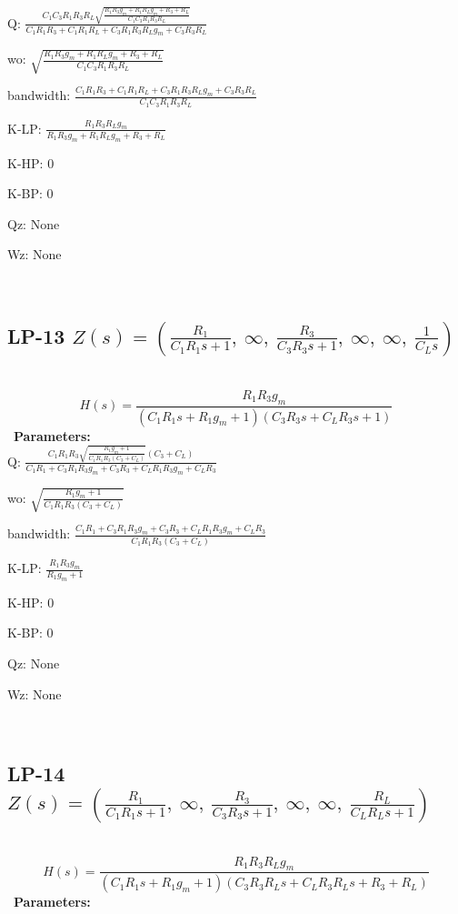 \documentclass{article}
\begin{document}
Q: $\frac{C_{1} C_{3} R_{1} R_{3} R_{L} \sqrt{\frac{R_{1} R_{3} g_{m} + R_{1} R_{L} g_{m} + R_{3} + R_{L}}{C_{1} C_{3} R_{1} R_{3} R_{L}}}}{C_{1} R_{1} R_{3} + C_{1} R_{1} R_{L} + C_{3} R_{1} R_{3} R_{L} g_{m} + C_{3} R_{3} R_{L}}$\ 

wo: $\sqrt{\frac{R_{1} R_{3} g_{m} + R_{1} R_{L} g_{m} + R_{3} + R_{L}}{C_{1} C_{3} R_{1} R_{3} R_{L}}}$\ 

bandwidth: $\frac{C_{1} R_{1} R_{3} + C_{1} R_{1} R_{L} + C_{3} R_{1} R_{3} R_{L} g_{m} + C_{3} R_{3} R_{L}}{C_{1} C_{3} R_{1} R_{3} R_{L}}$\ 

K-LP: $\frac{R_{1} R_{3} R_{L} g_{m}}{R_{1} R_{3} g_{m} + R_{1} R_{L} g_{m} + R_{3} + R_{L}}$\ 

K-HP: $0$\ 

K-BP: $0$\ 

Qz: $\text{None}$\ 

Wz: $\text{None}$\ 

\ 

\subsection{LP-13 $Z(s) = \left( \frac{R_{1}}{C_{1} R_{1} s + 1}, \  \infty, \  \frac{R_{3}}{C_{3} R_{3} s + 1}, \  \infty, \  \infty, \  \frac{1}{C_{L} s}\right)$ } \ 
\textbf{\[H(s) = \frac{R_{1} R_{3} g_{m}}{\left(C_{1} R_{1} s + R_{1} g_{m} + 1\right) \left(C_{3} R_{3} s + C_{L} R_{3} s + 1\right)}\] } \ 
\textbf{Parameters:}\\ 

Q: $\frac{C_{1} R_{1} R_{3} \sqrt{\frac{R_{1} g_{m} + 1}{C_{1} R_{1} R_{3} \left(C_{3} + C_{L}\right)}} \left(C_{3} + C_{L}\right)}{C_{1} R_{1} + C_{3} R_{1} R_{3} g_{m} + C_{3} R_{3} + C_{L} R_{1} R_{3} g_{m} + C_{L} R_{3}}$\ 

wo: $\sqrt{\frac{R_{1} g_{m} + 1}{C_{1} R_{1} R_{3} \left(C_{3} + C_{L}\right)}}$\ 

bandwidth: $\frac{C_{1} R_{1} + C_{3} R_{1} R_{3} g_{m} + C_{3} R_{3} + C_{L} R_{1} R_{3} g_{m} + C_{L} R_{3}}{C_{1} R_{1} R_{3} \left(C_{3} + C_{L}\right)}$\ 

K-LP: $\frac{R_{1} R_{3} g_{m}}{R_{1} g_{m} + 1}$\ 

K-HP: $0$\ 

K-BP: $0$\ 

Qz: $\text{None}$\ 

Wz: $\text{None}$\ 

\ 

\subsection{LP-14 $Z(s) = \left( \frac{R_{1}}{C_{1} R_{1} s + 1}, \  \infty, \  \frac{R_{3}}{C_{3} R_{3} s + 1}, \  \infty, \  \infty, \  \frac{R_{L}}{C_{L} R_{L} s + 1}\right)$ } \ 
\textbf{\[H(s) = \frac{R_{1} R_{3} R_{L} g_{m}}{\left(C_{1} R_{1} s + R_{1} g_{m} + 1\right) \left(C_{3} R_{3} R_{L} s + C_{L} R_{3} R_{L} s + R_{3} + R_{L}\right)}\] } \ 
\textbf{Parameters:}\\ 
\end{document}
